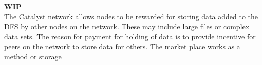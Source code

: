 \textbf{WIP} \\

The Catalyst network allows nodes to be rewarded for storing data added to the DFS by other nodes on the network. These may include large files or complex data sets. The reason for payment for holding of data is to provide incentive for peers on the network to store data for others. The market place works as a method or storage 